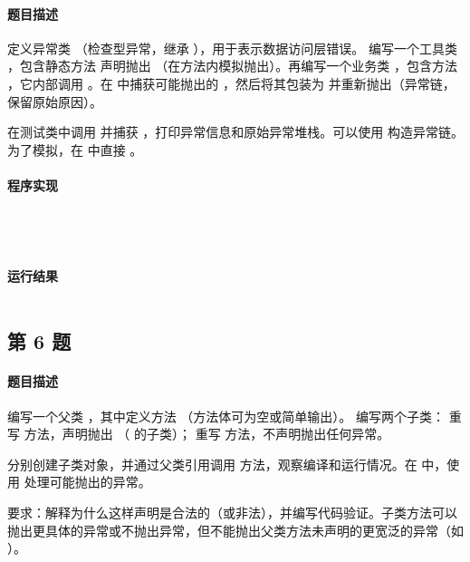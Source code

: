\documentclass{academics}
\begin{document}
\paragraph{题目描述} {
    定义异常类 （检查型异常，继承 ），用于表示数据访问层错误。
    编写一个工具类 ，包含静态方法  声明抛出 （在方法内模拟抛出）。再编写一个业务类 ，包含方法 ，它内部调用 。在  中捕获可能抛出的 ，然后将其包装为  并重新抛出（异常链，保留原始原因）。

    在测试类中调用  并捕获 ，打印异常信息和原始异常堆栈。可以使用  构造异常链。为了模拟，在  中直接 。
}

\paragraph{程序实现} {
    \inputminted[label=DataAccessException.java]{java}{../src/P05/DataAccessException.java}
    \inputminted[label=FileUtil.java]{java}{../src/P05/FileUtil.java}
    \inputminted[label=DataService.java]{java}{../src/P05/DataService.java}
    \inputminted[label=DataServiceTest.java]{java}{../src/P05/DataServiceTest.java}
}

\paragraph{运行结果} {
    \inputminted{text}{../res/P05.out}
}

\subsection{第 6 题}

\paragraph{题目描述} {
    编写一个父类 ，其中定义方法 （方法体可为空或简单输出）。
    编写两个子类： 重写  方法，声明抛出 （ 的子类）； 重写  方法，不声明抛出任何异常。

    分别创建子类对象，并通过父类引用调用  方法，观察编译和运行情况。在  中，使用  处理可能抛出的异常。

    要求：解释为什么这样声明是合法的（或非法），并编写代码验证。子类方法可以抛出更具体的异常或不抛出异常，但不能抛出父类方法未声明的更宽泛的异常（如 ）。
}
\end{document}
